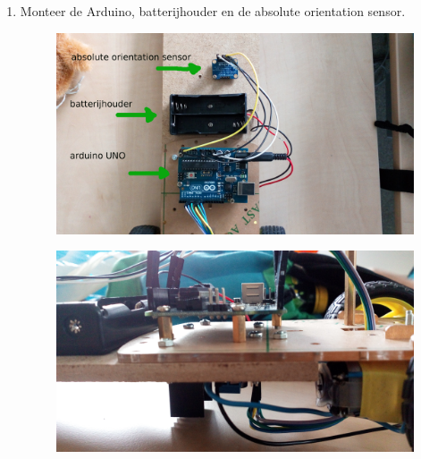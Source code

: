 \documentclass[12pt,a4paper]{article}
\begin{document}
\begin{enumerate}
\begin{figure}[H]
			\label{fig:vastzetten_mc}
		\end{figure}
	\item Monteer de Arduino, batterijhouder en de absolute orientation sensor.
	\begin{figure}[H]
		\centering
		\includegraphics[width=0.7\linewidth]{vastzetten_onderdelen}
		\label{fig:vastzetten_onderdelen}
	\end{figure}
	\begin{figure}[H]
		\centering
		\includegraphics[width=0.7\linewidth]{vastzetten_zijkant}
		\label{fig:vastzetten_zijkant}
	\end{figure}	
\end{enumerate}
\end{document}
